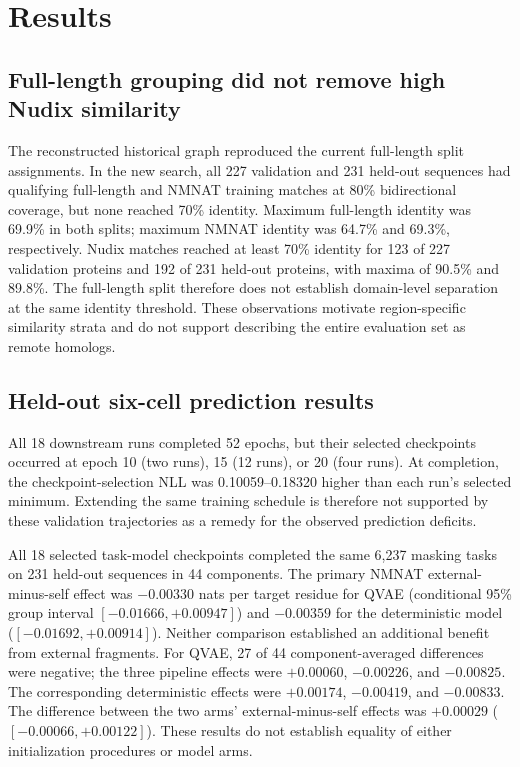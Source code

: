 \documentclass[referee,pdflatex,sn-vancouver-num]{sn-jnl}
\begin{document}
\section{Results}
\subsection{Full-length grouping did not remove high Nudix similarity}
The reconstructed historical graph reproduced the current full-length split assignments. In the new search, all 227 validation and 231 held-out sequences had qualifying full-length and NMNAT training matches at 80\% bidirectional coverage, but none reached 70\% identity. Maximum full-length identity was 69.9\% in both splits; maximum NMNAT identity was 64.7\% and 69.3\%, respectively. Nudix matches reached at least 70\% identity for 123 of 227 validation proteins and 192 of 231 held-out proteins, with maxima of 90.5\% and 89.8\%. The full-length split therefore does not establish domain-level separation at the same identity threshold. These observations motivate region-specific similarity strata and do not support describing the entire evaluation set as remote homologs.

\subsection{Held-out six-cell prediction results}
All 18 downstream runs completed 52 epochs, but their selected checkpoints occurred at epoch 10 (two runs), 15 (12 runs), or 20 (four runs). At completion, the checkpoint-selection NLL was 0.10059--0.18320 higher than each run's selected minimum. Extending the same training schedule is therefore not supported by these validation trajectories as a remedy for the observed prediction deficits.

All 18 selected task-model checkpoints completed the same 6,237 masking tasks on 231 held-out sequences in 44 components. The primary NMNAT external-minus-self effect was $-0.00330$ nats per target residue for QVAE (conditional 95\% group interval $[-0.01666,+0.00947]$) and $-0.00359$ for the deterministic model ($[-0.01692,+0.00914]$). Neither comparison established an additional benefit from external fragments. For QVAE, 27 of 44 component-averaged differences were negative; the three pipeline effects were $+0.00060$, $-0.00226$, and $-0.00825$. The corresponding deterministic effects were $+0.00174$, $-0.00419$, and $-0.00833$. The difference between the two arms' external-minus-self effects was $+0.00029$ ($[-0.00066,+0.00122]$). These results do not establish equality of either initialization procedures or model arms.
\end{document}
